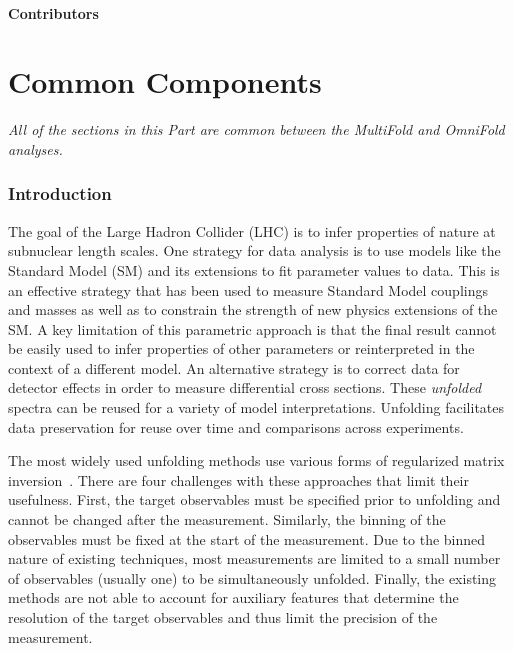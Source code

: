 \subsection{Contributors}


\clearpage



\clearpage

\part{Common Components}
\label{part:common}

\textit{All of the sections in this Part are common between the MultiFold and OmniFold analyses.}

\section{Introduction}
\label{sec:intro}

The goal of the Large Hadron Collider (LHC) is to infer properties of nature at subnuclear length scales.   One strategy for data analysis is to use models like the Standard Model (SM) and its extensions to fit parameter values to data.  This is an effective strategy that has been used to measure Standard Model couplings and masses as well as to constrain the strength of new physics extensions of the SM.  A key limitation of this parametric approach is that the final result cannot be easily used to infer properties of other parameters or reinterpreted in the context of a different model.  An alternative strategy is to correct data for detector effects in order to measure differential cross sections.  These \textit{unfolded} spectra can be reused for a variety of model interpretations.   Unfolding facilitates data preservation for reuse over time and comparisons across experiments.

The most widely used unfolding methods use various forms of regularized matrix inversion~\cite{DAGOSTINI1995487,Hocker:1995kb,Schmitt:2012kp}.  There are four challenges with these approaches that limit their usefulness.   First, the target observables must be specified prior to unfolding and cannot be changed after the measurement.  Similarly, the binning of the observables must be fixed at the start of the measurement.  Due to the binned nature of existing techniques, most measurements are limited to a small number of observables (usually one) to be simultaneously unfolded.  Finally, the existing methods are not able to account for auxiliary features that determine the resolution of the target observables and thus limit the precision of the measurement.

